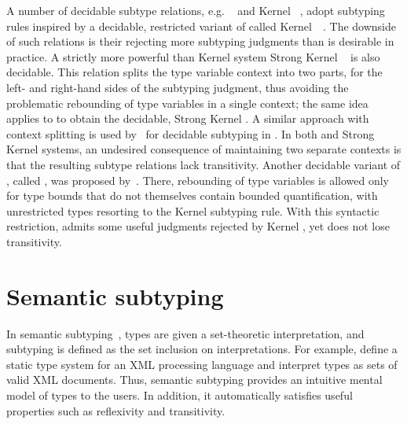 A number of decidable subtype relations,
e.g. \WyvSelf~\cite{mackay:path-dep-dec:2020}
and Kernel \DSub~\cite{hu:dot-undec:2020},
adopt subtyping rules inspired by a decidable, restricted variant of \FSub
called Kernel~\FSub~\cite{cardelli:types-poly:1985}.
The downside of such relations is their rejecting more subtyping judgments
than is desirable in practice.
A strictly more powerful than Kernel \DSub system
Strong Kernel \DSub~\cite{hu:dot-undec:2020} is also decidable.
This relation splits the type variable context into two parts, for the left-
and right-hand sides of the subtyping judgment, thus avoiding the problematic
rebounding of type variables in a single context;
the same idea applies to \FSub to obtain the decidable, Strong Kernel \FSub.
A similar approach with context splitting is used
by~\citet{mackay:path-dep-dec:2020} for decidable subtyping in \WyvFix.
In both \WyvFix and Strong Kernel systems,
an undesired consequence of maintaining two separate contexts
is that the resulting subtype relations lack transitivity.
Another decidable variant of \FSub, called \FSubR, was proposed
by~\citet{mackay:bound-poly-sub-dec:2020}. There, %
rebounding of type variables is allowed
only for type bounds that do not themselves contain bounded quantification,
with unrestricted types resorting to the Kernel subtyping rule.
With this syntactic restriction, \FSubR admits some useful judgments
rejected by Kernel \FSub, yet does not lose transitivity.

\section{Semantic subtyping}

In semantic subtyping~\cite{frih:sem-sub:2008}, types are given a set-theoretic
interpretation, and subtyping is defined as the set inclusion on
interpretations.
For example, \citet{hosoya:reg-types-XML:2000} define a static type system for
an XML processing language and interpret types as sets of valid XML documents.
Thus, semantic subtyping provides an intuitive mental
model of types to the users. In addition, it automatically satisfies
useful properties such as reflexivity and transitivity.


